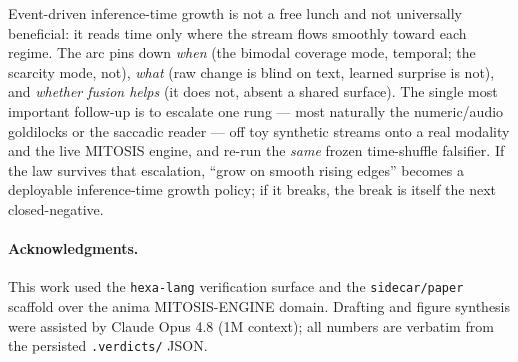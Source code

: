 \documentclass[11pt,a4paper]{article}
\begin{document}
Event-driven inference-time growth is not a free lunch and not universally
beneficial: it reads time only where the stream flows smoothly toward each regime.
The arc pins down \emph{when} (the bimodal coverage mode, temporal; the scarcity
mode, not), \emph{what} (raw change is blind on text, learned surprise is not), and
\emph{whether fusion helps} (it does not, absent a shared surface). The single most
important follow-up is to escalate one rung --- most naturally the numeric/audio
goldilocks or the saccadic reader --- off toy synthetic streams onto a real
modality and the live MITOSIS engine, and re-run the \emph{same} frozen
time-shuffle falsifier. If the law survives that escalation, ``grow on smooth
rising edges'' becomes a deployable inference-time growth policy; if it breaks, the
break is itself the next closed-negative.

\paragraph{Acknowledgments.}
This work used the \texttt{hexa-lang} verification surface and the
\texttt{sidecar/paper} scaffold over the anima MITOSIS-ENGINE domain. Drafting and
figure synthesis were assisted by Claude Opus 4.8 (1M context); all numbers are
verbatim from the persisted \texttt{.verdicts/} JSON.



\end{document}
